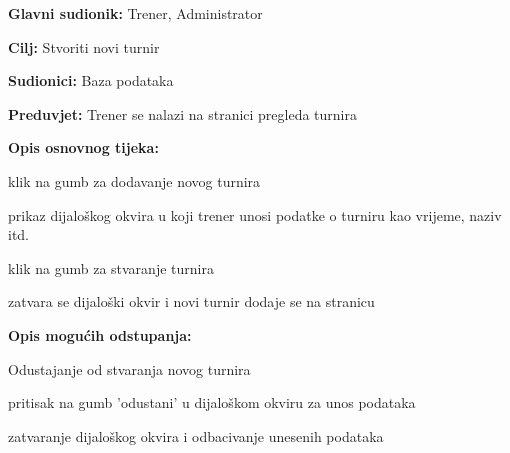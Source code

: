 					\noindent {}
					\begin{packed_item}
	
						\item \textbf{Glavni sudionik: }Trener, Administrator
						\item  \textbf{Cilj: } Stvoriti novi turnir
						\item  \textbf{Sudionici: } Baza podataka
						\item  \textbf{Preduvjet: } Trener se nalazi na stranici pregleda turnira
						\item  \textbf{Opis osnovnog tijeka:}
						
						\item[] \begin{packed_enum}
	
							\item klik na gumb za dodavanje novog turnira
							\item prikaz dijaloškog okvira u koji trener unosi podatke o turniru kao vrijeme, naziv itd.
							\item klik na gumb za stvaranje turnira
							\item zatvara se dijaloški okvir i novi turnir dodaje se na stranicu
							
						\end{packed_enum}
						
						\item  \textbf{Opis mogućih odstupanja:}
						
						\item[] \begin{packed_item}
	
							\item Odustajanje od stvaranja novog turnira
							\item[] \begin{packed_enum}
								
								\item pritisak na gumb 'odustani' u dijaloškom okviru za unos podataka
								\item zatvaranje dijaloškog okvira i odbacivanje unesenih podataka
								
							\end{packed_enum}
							
						\end{packed_item}
					\end{packed_item}
					
